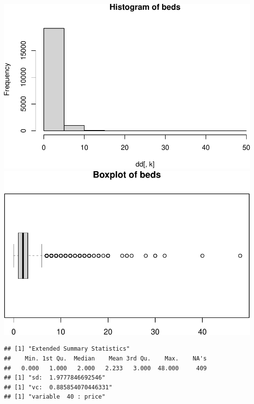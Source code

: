 \includegraphics{anal_files/figure-latex/unnamed-chunk-7-24.pdf}
\includegraphics{anal_files/figure-latex/unnamed-chunk-7-25.pdf}

\begin{verbatim}
## [1] "Extended Summary Statistics"
##    Min. 1st Qu.  Median    Mean 3rd Qu.    Max.    NA's 
##   0.000   1.000   2.000   2.233   3.000  48.000     409 
## [1] "sd:  1.9777846692546"
## [1] "vc:  0.885854070446331"
## [1] "variable  40 : price"
\end{verbatim}

